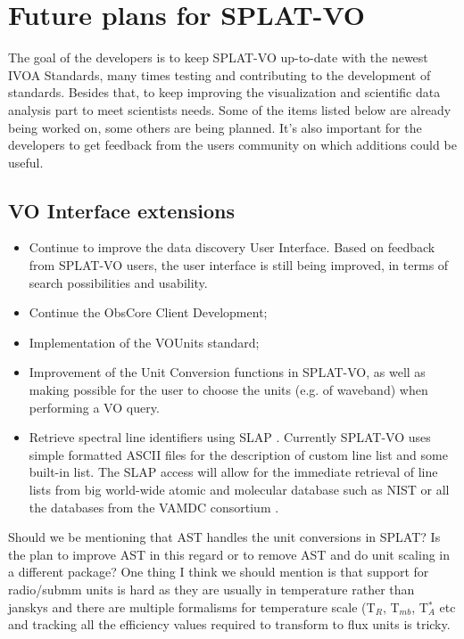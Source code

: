 \documentclass[final,authoryear,5p,times,twocolumn]{elsarticle}
\begin{document}
\section{Future plans for SPLAT-VO}

The goal of the developers is to keep SPLAT-VO up-to-date with the
newest IVOA Standards, many times testing and contributing to the
development of standards. Besides that, to keep improving the
visualization and scientific data analysis part to meet scientists
needs.  Some of the items listed below are already being worked on,
some others are being planned. It's also important for the developers
to get feedback from the users community on which additions could be
useful.

\subsection{VO Interface extensions}
\begin{itemize}
\item Continue to improve the data discovery User Interface.
Based on feedback from SPLAT-VO users, the user interface is still being
improved, in terms of search possibilities and usability.
\item Continue the ObsCore Client Development;
\item Implementation of  the VOUnits \citep{vounits} standard;
\item	Improvement of the Unit Conversion functions in SPLAT-VO, as well as making possible for the user to choose the units  (e.g. of waveband) when performing a VO query.
\item Retrieve spectral line identifiers using SLAP \citep[Simple Line
  Access Protocol;][]{slap}. Currently SPLAT-VO uses simple formatted
  ASCII files for the description of custom line list and some
  built-in list. The SLAP access will allow for the immediate
  retrieval of line lists from  big world-wide atomic and molecular
  database such as NIST \citep{NIST_ASD} or all the databases from the
  VAMDC consortium  \citep{2011BaltA..20..503K}.
\end{itemize}

{\color{red} Should we be mentioning that AST handles the unit
  conversions in SPLAT? Is the plan to improve AST in this regard or
  to remove AST and do unit scaling in a different package? One thing
  I think we should mention is that support for radio/submm units is
  hard as they are usually in temperature rather than janskys and
  there are multiple formalisms for temperature scale (T$_R$,
  T$_{mb}$, T$^*_A$ etc and tracking all the efficiency values
  required to transform to flux units is tricky.}
\end{document}
